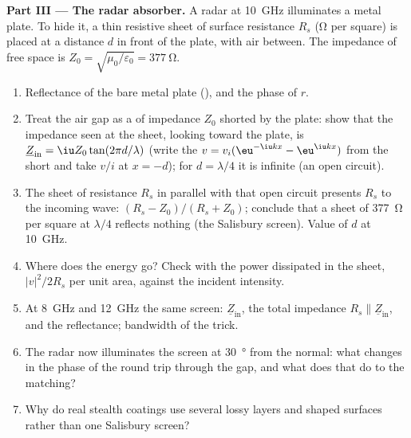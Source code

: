 \begin{problem}
\medskip
\noindent\textbf{Part III --- The radar absorber.}
A radar at \qty{10}{GHz} illuminates a metal plate. To hide it, a thin
resistive sheet of surface resistance $R_s$ (\unit{\ohm} per square) is
placed at a distance $d$ in front of the plate, with air between.
The impedance of free space is $Z_0 = \sqrt{\mu_0/\varepsilon_0} = \qty{377}{\ohm}$.
\begin{enumerate}[resume]
  \item Reflectance of the bare metal plate (), and
        the phase of $r$.
  \item Treat the air gap as a  of impedance $Z_0$
        shorted by the plate: show that the impedance seen at the
        sheet, looking toward the plate, is $\underline Z_{\text{in}} = \iu Z_0
        \tan(2\pi d/\lambda)$ (write the  $v = v_i(\eu^{-\iu kx} -
        \eu^{\iu kx})$ from the short and take $v/i$ at $x = -d$); for $d =
        \lambda/4$ it is infinite (an open circuit).
  \item The sheet of resistance $R_s$ in parallel with that open
        circuit presents $R_s$ to the incoming wave:  $(R_s - Z_0)/(R_s + Z_0)$; conclude that a sheet of
        \qty{377}{\ohm} per square at $\lambda/4$ reflects nothing (the
        Salisbury screen). Value of $d$ at \qty{10}{GHz}.
  \item Where does the energy go? Check with the power dissipated
        in the sheet, $|v|^2/2R_s$ per unit area, against the incident
        intensity.
  \item At \qty{8}{GHz} and \qty{12}{GHz} the same screen: $\underline Z_{\text{in}}$,
        the total impedance $R_s \parallel \underline Z_{\text{in}}$, and the
        reflectance; bandwidth of the trick.
  \item The radar now illuminates the screen at \qty{30}{\degree} from
        the normal: what changes in the phase of the round trip
        through the gap, and what does that do to the matching?
  \item Why do real stealth coatings use several lossy layers and
        shaped surfaces rather than one Salisbury screen?
\end{enumerate}


\end{problem}
